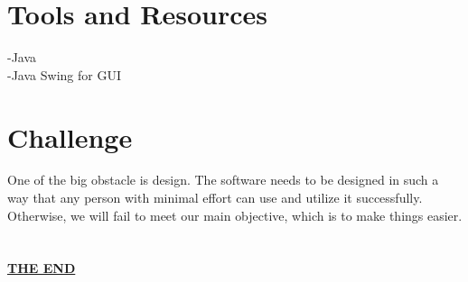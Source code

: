 \documentclass{article}
\begin{document}
\section*{\LARGE Tools and Resources}
\Large -Java\\
\Large -Java Swing for GUI
 
 \pagebreak
{}
\section*{\LARGE Challenge}
\large One of the big obstacle is design. The software needs to be designed in such a way that any person with minimal effort can use and utilize it successfully. Otherwise, we will fail to meet our main objective, which is to make things easier.\\\\\\

\centering \underline{\textbf{\Large THE END}}
\end{document}
